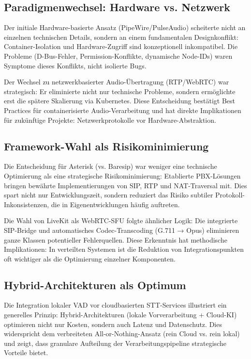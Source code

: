 \subsection{Paradigmenwechsel: Hardware vs. Netzwerk}

Der initiale Hardware-basierte Ansatz (PipeWire/PulseAudio) scheiterte nicht an einzelnen technischen Details, sondern an einem fundamentalen Designkonflikt: Container-Isolation und Hardware-Zugriff sind konzeptionell inkompatibel. Die Probleme (D-Bus-Fehler, Permission-Konflikte, dynamische Node-IDs) waren Symptome dieses Konflikts, nicht isolierte Bugs.

Der Wechsel zu netzwerkbasierter Audio-Übertragung (\acrshort{RTP}/\acrshort{WebRTC}) war strategisch: Er eliminierte nicht nur technische Probleme, sondern ermöglichte erst die spätere Skalierung via Kubernetes. Diese Entscheidung bestätigt Best Practices für containerisierte Audio-Verarbeitung und hat direkte Implikationen für zukünftige Projekte: Netzwerkprotokolle vor Hardware-Abstraktion.

\subsection{Framework-Wahl als Risikominimierung}

Die Entscheidung für Asterisk (vs. Baresip) war weniger eine technische Optimierung als eine strategische Risikominimierung: Etablierte \acrshort{PBX}-Lösungen bringen bewährte Implementierungen von \acrshort{SIP}, \acrshort{RTP} und \acrshort{NAT}-Traversal mit. Dies spart nicht nur Entwicklungszeit, sondern reduziert das Risiko subtiler Protokoll-Inkonsistenzen, die in Eigenentwicklungen häufig auftreten.

Die Wahl von LiveKit als \acrshort{WebRTC}-\acrshort{SFU} folgte ähnlicher Logik: Die integrierte \acrshort{SIP}-Bridge und automatisches Codec-Transcoding (G.711 → Opus) eliminieren ganze Klassen potentieller Fehlerquellen. Diese Erkenntnis hat methodische Implikationen: In verteilten Systemen ist die Reduktion von Integrationspunkten oft wichtiger als die Optimierung einzelner Komponenten.

\subsection{Hybrid-Architekturen als Optimum}

Die Integration lokaler \acrshort{VAD} vor cloudbasierten \acrshort{STT}-Services illustriert ein generelles Prinzip: Hybrid-Architekturen (lokale Vorverarbeitung + Cloud-\acrshort{KI}) optimieren nicht nur Kosten, sondern auch Latenz und Datenschutz. Dies widerspricht dem verbreiteten All-or-Nothing-Ansatz (rein Cloud vs. rein lokal) und zeigt, dass granulare Aufteilung der Verarbeitungspipeline strategische Vorteile bietet.

